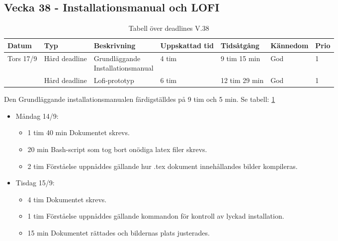 \documentclass{TDP003mall}
\begin{document}
\subsection*{Vecka 38 - Installationsmanual och LOFI}
\begin{table}[h!]
  \caption{Tabell över deadlines V.38\label{tab:3}}
\begin{tabularx}{\linewidth}{|l|l|l|l|l|l|l|}
  \hline
  Datum     & Typ           & Beskrivning                                        & Uppskattad tid & Tidsåtgång    & Kännedom & Prio\\
  \hline                                                    
  Tors 17/9 & Hård deadline & \makecell[tl]{Grundläggande \\Installationsmanual} & 4 tim          & 9 tim 15 min  & God      & 1\\
  \hline                                                    
            & Hård deadline & Lofi-prototyp                                      & 6 tim          & 12 tim 29 min & God      & 1\\
  \hline
\end{tabularx}  
  \end{table}

Den Grundläggande installationsmanualen färdigställdes på 9 tim och 5 min. Se tabell: \ref{tab:3}
\begin{itemize}
  \item Måndag 14/9:
  \begin{itemize}
    \item 1 tim 40 min Dokumentet skrevs.
    \item 20 min Bash-script som tog bort onödiga latex filer skrevs.
    \item 2 tim Förståelse uppnåddes gällande hur .tex dokument innehållandes bilder kompileras.
  \end{itemize}
  \item Tisdag 15/9:
  \begin{itemize}
    \item 4 tim Dokumentet skrevs.
    \item 1 tim Förståelse uppnåddes gällande kommandon för kontroll av lyckad installation.
    \item 15 min Dokumentet rättades och bildernas plats justerades.
  \end{itemize}
\end{itemize}
\end{document}
